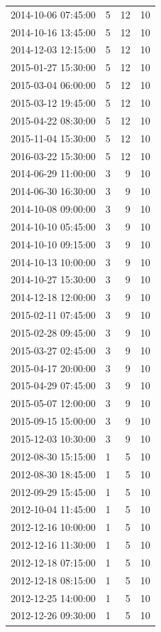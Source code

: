 \begin{tabular}{lrrr}
2014-10-06 07:45:00 & 5 & 12 & 10 \\
2014-10-16 13:45:00 & 5 & 12 & 10 \\
2014-12-03 12:15:00 & 5 & 12 & 10 \\
2015-01-27 15:30:00 & 5 & 12 & 10 \\
2015-03-04 06:00:00 & 5 & 12 & 10 \\
2015-03-12 19:45:00 & 5 & 12 & 10 \\
2015-04-22 08:30:00 & 5 & 12 & 10 \\
2015-11-04 15:30:00 & 5 & 12 & 10 \\
2016-03-22 15:30:00 & 5 & 12 & 10 \\
2014-06-29 11:00:00 & 3 & 9 & 10 \\
2014-06-30 16:30:00 & 3 & 9 & 10 \\
2014-10-08 09:00:00 & 3 & 9 & 10 \\
2014-10-10 05:45:00 & 3 & 9 & 10 \\
2014-10-10 09:15:00 & 3 & 9 & 10 \\
2014-10-13 10:00:00 & 3 & 9 & 10 \\
2014-10-27 15:30:00 & 3 & 9 & 10 \\
2014-12-18 12:00:00 & 3 & 9 & 10 \\
2015-02-11 07:45:00 & 3 & 9 & 10 \\
2015-02-28 09:45:00 & 3 & 9 & 10 \\
2015-03-27 02:45:00 & 3 & 9 & 10 \\
2015-04-17 20:00:00 & 3 & 9 & 10 \\
2015-04-29 07:45:00 & 3 & 9 & 10 \\
2015-05-07 12:00:00 & 3 & 9 & 10 \\
2015-09-15 15:00:00 & 3 & 9 & 10 \\
2015-12-03 10:30:00 & 3 & 9 & 10 \\
2012-08-30 15:15:00 & 1 & 5 & 10 \\
2012-08-30 18:45:00 & 1 & 5 & 10 \\
2012-09-29 15:45:00 & 1 & 5 & 10 \\
2012-10-04 11:45:00 & 1 & 5 & 10 \\
2012-12-16 10:00:00 & 1 & 5 & 10 \\
2012-12-16 11:30:00 & 1 & 5 & 10 \\
2012-12-18 07:15:00 & 1 & 5 & 10 \\
2012-12-18 08:15:00 & 1 & 5 & 10 \\
2012-12-25 14:00:00 & 1 & 5 & 10 \\
2012-12-26 09:30:00 & 1 & 5 & 10 \\

\end{tabular}
